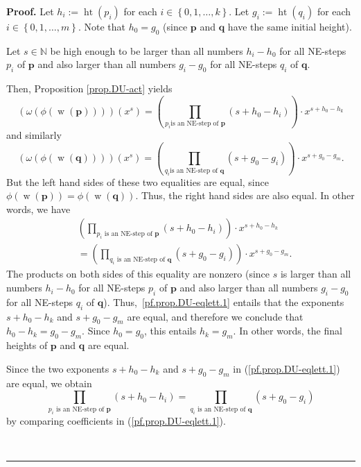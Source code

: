 \documentclass[numbers=enddot,12pt,final,onecolumn,notitlepage]{scrartcl}%
\theoremstyle{definition}
\newenvironment{proof}[1][Proof]{\noindent\textbf{#1.} }{\ \rule{0.5em}{0.5em}}
\newcommand{\NN}{\mathbb{N}}
\newcommand{\pp}{\mathbf{p}}
\newcommand{\qq}{\mathbf{q}}
\newcommand{\w}{\operatorname{w}}
\newcommand{\htt}{\operatorname{ht}}
\newenvironment{verlong}{}{}
\begin{document}
\begin{verlong}
\begin{proof}
Let $h_{i}:=\htt\left(  p_{i}\right)  $ for each $i\in\left\{
0,1,\ldots,k\right\}  $. Let $g_{i}:=\htt\left(  q_{i}\right)  $
for each $i\in\left\{  0,1,\ldots,m\right\}  $. Note that $h_{0}=g_{0}$ (since
$\pp$ and $\qq$ have the same initial height).

Let $s\in\NN$ be high enough to be larger than all numbers $h_{i}%
-h_{0}$ for all NE-steps $p_{i}$ of $\pp$ and also larger than all
numbers $g_{i}-g_{0}$ for all NE-steps $q_{i}$ of $\qq$.

Then, Proposition \ref{prop.DU-act} yields
\[
\left(  \omega\left(  \phi\left(  \w\left(  \pp\right)
\right)  \right)  \right)  \left(  x^{s}\right)  =\left(  \prod_{p_{i}\text{
is an NE-step of }\pp}\left(  s+h_{0}-h_{i}\right)  \right)  \cdot
x^{s+h_{0}-h_{k}}%
\]
and similarly%
\[
\left(  \omega\left(  \phi\left(  \w\left(  \qq\right)
\right)  \right)  \right)  \left(  x^{s}\right)  =\left(  \prod_{q_{i}\text{
is an NE-step of }\qq}\left(  s+g_{0}-g_{i}\right)  \right)  \cdot
x^{s+g_{0}-g_{m}}.
\]
But the left hand sides of these two equalities are equal, since $\phi\left(
\w\left(  \pp\right)  \right)  =\phi\left(
\w\left(  \qq\right)  \right)  $. Thus, the right hand
sides are also equal. In other words, we have%
\begin{align}
& \left(  \prod_{p_{i}\text{ is an NE-step of }\pp}\left(
s+h_{0}-h_{i}\right)  \right)  \cdot x^{s+h_{0}-h_{k}}\nonumber\\
& =\left(  \prod_{q_{i}\text{ is an NE-step of }\qq}\left(
s+g_{0}-g_{i}\right)  \right)  \cdot x^{s+g_{0}-g_{m}}%
.\label{pf.prop.DU-eqlett.1}%
\end{align}
The products on both sides of this equality are nonzero (since $s$ is larger
than all numbers $h_{i}-h_{0}$ for all NE-steps $p_{i}$ of $\pp$ and
also larger than all numbers $g_{i}-g_{0}$ for all NE-steps $q_{i}$ of
$\qq$). Thus,~\eqref{pf.prop.DU-eqlett.1} entails that the exponents $s+h_{0}-h_{k}$ and
$s+g_{0}-g_{m}$ are equal, and therefore we conclude that $h_{0}-h_{k}%
=g_{0}-g_{m}$. Since $h_{0}=g_{0}$, this entails $h_{k}=g_{m}$. In other
words, the final heights of $\pp$ and $\qq$ are equal.

Since the two exponents $s+h_{0}-h_{k}$ and $s+g_{0}-g_{m}$ in
(\ref{pf.prop.DU-eqlett.1}) are equal, we obtain%
\[
\prod_{p_{i}\text{ is an NE-step of }\pp}\left(  s+h_{0}-h_{i}\right)
=\prod_{q_{i}\text{ is an NE-step of }\qq}\left(  s+g_{0}-g_{i}\right)
\]
by comparing coefficients in (\ref{pf.prop.DU-eqlett.1}).


\end{proof}
\end{verlong}
\end{document}
